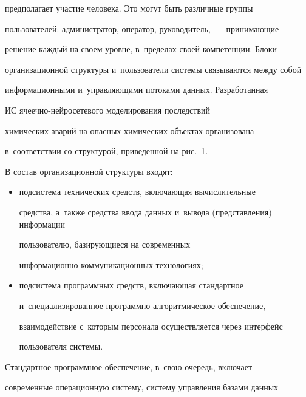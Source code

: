 предполагает участие человека. Это могут быть различные группы 


пользователей: администратор, оператор, руководитель,~--- принимающие 


решение каждый на своем уровне, в~пределах своей компетенции. Блоки 


организационной структуры и~пользователи системы связываются между собой 


информационными и~управляющими потоками данных. Разработанная 


ИС яче\-еч\-но-ней\-ро\-се\-те\-во\-го моделирования последствий 


химических аварий на опасных химических объектах организована 


в~соответствии со структурой, приведенной на рис.~1.








       


  В состав организационной структуры входят:


  \begin{itemize}


  \item подсистема технических средств, включающая вычислительные 


средства, а~также средства ввода данных и~вывода (представления) информации 


пользователю, базирующиеся на современных  


ин\-фор\-ма\-ци\-он\-но-ком\-му\-ни\-ка\-ци\-он\-ных технологиях;\\[-15pt]


  \item подсистема программных средств, включающая стандартное 


и~специализированное про\-граммно-ал\-го\-рит\-ми\-че\-ское обеспечение, 


взаимодействие с~которым персонала осуществляется через интерфейс 


пользователя системы.


  \end{itemize}


  


  Стандартное программное обеспечение, в~свою очередь, включает 


современные операционную систему, систему управления базами данных 


